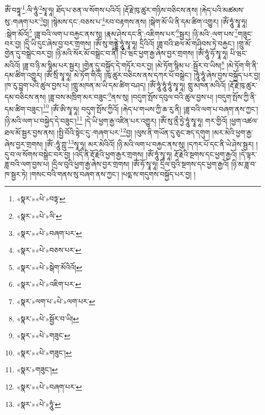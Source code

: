 ཨོཾ་བཏྟཱ་\footnote{«སྣར་»«པེ་»བཏྟ་}:ལི་ཧཱུཾ་\footnote{«སྣར་»«པེ་»ལི་}སྭཱ་ཧཱ། ཐོད་པ་ཅན་ལ་སོགས་པའིའོ། །རྡོ་རྗེ་ཁུ་ཚུར་གཉིས་བཅིངས་ནས། །རྐེད་པའི་མཚམས་སུ་:གཞག་པར་\footnote{«སྣར་»«པེ་»བཞག་པར་}བྱ། །སྙེམས་དང་:བཅས་པ་\footnote{«སྣར་»«པེ་»བཅས་པར་}རབ་བརྟགས་ནས། །སྒེག་མོ་ཡི་ནི་དམ་ཚིག་འགྱུར། །ཨོཾ་ཧཱུཾ་སྭཱ་ཧཱ། :སྒེག་མོའོ།\footnote{«སྣར་»«པེ་»སྒེག་མོའིའོ།} །ཟླ་བའི་ལག་པ་བརྐྱང་ནས་སུ། །རྣམ་ཤེས་དང་ནི་:འཇིགས་པར་\footnote{«སྣར་»«པེ་»འཇིག་པར་}སྦྱར། །ཉི་མའི་:ལག་པས་\footnote{«སྣར་»ལག་པ་«པེ་»ལག་པར་}གཟུང་བར་བྱ། །དྲི་ཡི་དུང་ཞེས་བྱ་བར་གྲགས། །ཨོཾ་སུ་གནྡྷེ་ཧཱུཾ་སྭཱ་ཧཱ། དྲིའིའོ། །ཟླ་བའི་ཐལ་མོ་གཤིབས་ཏེ་བརྐྱང་། །གྲུ་མོ་གྱེན་དུ་བསྒྲེང་བར་བྱ། །ཉི་མའི་སོར་མོ་བསྒྲེང་བ་ནི། །པི་ཝང་ཕྱག་རྒྱ་ཞེས་བྱར་གྲགས། །ཨོཾ་ཧཱུཾ་ཧོ་སྭཱ་ཧཱ། པི་ཝང་མའིའོ། །ཟླ་བ་ཉི་མ་སྙིམ་པར་སྦྱར། །གྱེན་དུ་བསྐྱོད་དེ་གཏོར་བར་བྱ། །མེ་ཏོག་སྙིམ་པ་:སྦྱོར་བ་ཡིས།\footnote{«སྣར་»«པེ་»སྦྱོར་བ་ཡི།} །མེ་ཏོག་གི་ནི་དམ་ཚིག་འགྱུར། །ཨོཾ་སྲིཾ་སྭཱ་ཧཱ། མེ་ཏོག་གིའོ། །ཁུ་ཚུར་བཅིངས་ནས་དཀར་པོ་བསྒྲེང་། །ཧཱུཾ་ཧཱུཾ་ཞེས་བྱས་བསྐྱོད་པར་བྱ། །ཁ་རུ་བྱུག་པའི་ཚུལ་བྱས་པ། །གླུ་མཁན་མ་ཡི་དམ་ཚིག་བཤད། །ཨོཾ་ཧཱུཾ་ཧཱུཾ་ཧཱུཾ་སྭཱ་ཧཱ། གླུ་མཁན་མའིའོ། །རྡོ་རྗེ་ཁུ་ཚུར་དམ་བཅིངས་ནས། །ཟླ་བས་མཁྲིག་མར་བཟུང་\footnote{«སྣར་»«པེ་»གཟུང་}ནས་སུ། །བདུག་སྤོས་དབུལ་བའི་ཚུལ་བྱས་པ། །བདུག་སྤོས་ཀྱི་ནི་དམ་ཚིག་བཟུང་།\footnote{«སྣར་»«པེ་»གཟུང་།} །ཨོཾ་ཨི་སྭཱ་ཧཱ། བདུག་སྤོས་ཀྱིའོ། །རྐེད་པ་གཡས་ཀྱི་ཆ་རུ་ནི། །ཟླ་བའི་ལག་པ་བཞག་ནས་ཀྱང་། །ཉི་མའི་ལག་པ་བསྐྱེད་དེ་བཟུང་།\footnote{«སྣར་»གཟུང་།} །དེ་ཡི་ཕྱག་རྒྱ་འཛིན་པར་འགྱུར། །ཨོཾ་སུ་ནྲྀ་ཏྱེ་ཧཱུཾ་སྭཱ་ཧཱ། གར་གྱིའོ། །ཕྱག་འཚལ་ཐལ་མོ་སྦྱར་བྱས་ནས། །སྤྱི་བོའི་སྟེང་དུ་:གཞག་པར་\footnote{«སྣར་»«པེ་»བཞག་པར་}བྱ། །ལུས་ནི་གཡོན་དུ་ཅུང་ཟད་དགུག །མར་མེའི་ཕྱག་རྒྱ་ཞེས་བྱར་གྲགས། །ཨོཾ་:ཧཱུཾ་ཀྵུ་\footnote{«སྣར་»«པེ་»ཧཱུཾ་}སྭཱ་ཧཱ། མར་མེའིའོ། །ཉི་མའི་ལག་པ་བརྐྱང་ནས་སུ། །དཀར་པོ་དང་ནི་ཡེ་ཤེས་སྦྱར། །དུ་བ་ལ་སོགས་བསྒྲེང་བར་བྱ། །འདི་ནི་རྡོ་རྗེའི་ཕྱག་རྒྱར་གྲགས། །ཨོཾ་ཧཱུཾ་སྭཱ་ཧཱ། རྡོ་རྗེའི་སྔགས་དང་ཕྱག་རྒྱའོ། །དེ་ལྟར་ཟླ་བའི་ལག་བྱས་པ། །དྲིལ་བུའི་ཕྱག་རྒྱ་ཞེས་བྱར་གྲགས། །ཨོཾ་ཧོ་སྭཱ་ཧཱ། དྲིལ་བུའི་སྔགས་དང་ཕྱག་རྒྱའོ། །ཉི་མ་ཟླ་བ་ཁ་སྦྱར་ཏེ། །གསང་བའི་གནས་སུ་བཞག་ནས་ཀྱང་། །པདྨ་ས་གདུགས་བསྐྱོད་པར་བྱ། །
